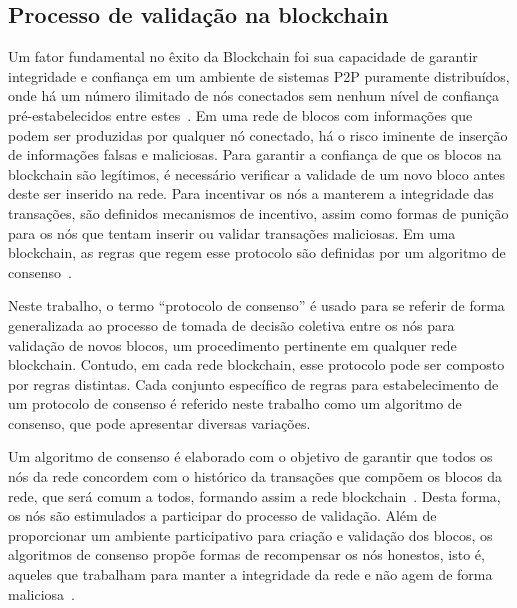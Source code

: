 \subsection{Processo de validação na blockchain} \label{tex:fund:blockchain:consenso}

Um fator fundamental no êxito da Blockchain foi sua capacidade de garantir integridade e confiança em um ambiente de sistemas P2P puramente distribuídos, onde há um número ilimitado de nós conectados sem nenhum nível de confiança pré-estabelecidos entre estes~\cite{overview-blockchainbasic2018drescher}. Em uma rede de blocos com informações que podem ser produzidas por qualquer nó conectado, há o risco iminente de inserção de informações falsas e maliciosas. Para garantir a confiança de que os blocos na blockchain são legítimos, é necessário verificar a validade de um novo bloco antes deste ser inserido na rede. Para incentivar os nós a manterem a integridade das transações, são definidos mecanismos de incentivo, assim como formas de punição para os nós que tentam inserir ou validar transações maliciosas. Em uma blockchain, as regras que regem esse protocolo são definidas por um algoritmo de consenso~\cite{overview-consenso2017sankar, consenso-zhang2020analysis, consenso-Bouraga2021}.


Neste trabalho, o termo ``protocolo de consenso'' é usado para se referir de forma generalizada ao processo de tomada de decisão coletiva entre os nós para validação de novos blocos, um procedimento pertinente em qualquer rede blockchain. Contudo, em cada rede blockchain, esse protocolo pode ser composto por regras distintas. Cada conjunto específico de regras para estabelecimento de um protocolo de consenso é referido neste trabalho como um algoritmo de consenso, que pode apresentar diversas variações.

Um algoritmo de consenso é elaborado com o objetivo de garantir que todos os nós da rede concordem com o histórico da transações que compõem os blocos da rede, que será comum a todos, formando assim a rede blockchain~\cite{consenso-xiao-2020}. Desta forma, os nós são estimulados a participar do processo de validação. Além de proporcionar um ambiente participativo para criação e validação dos blocos, os algoritmos de consenso propõe formas de recompensar os nós honestos, isto é, aqueles que trabalham para manter a integridade da rede e não agem de forma maliciosa~\cite{overview-consenso2017sankar}. 

